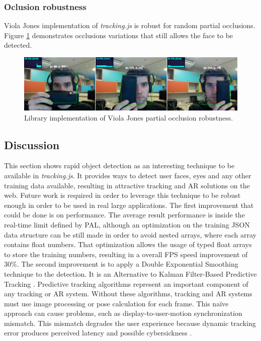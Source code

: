 
\subsubsection{Oclusion robustness} %
\label{subsub:evaluation:rapid_object_detection:results:occlusion_robustness}

Viola Jones implementation of \textit{tracking.js} is robust for random partial occlusions. Figure \ref{figure:viola_occlusion} demonstrates occlusions variations that still allows the face to be detected.

\begin{figure}[!htb]
  \centering
  \includegraphics[width=\linewidth]{chapters/evaluation/viola_occlusion.png}
  \caption{Library implementation of Viola Jones partial occlusion robustness.}
  \label{figure:viola_occlusion}
\end{figure}


\subsection{Discussion} %
\label{sub:evaluation:rapid_object_detection:discussion}

This section shows rapid object detection as an interesting technique to be available in \textit{tracking.js}. It provides ways to detect user faces, eyes and any other training data available, resulting in attractive tracking and AR solutions on the web. Future work is required in order to leverage this technique to be robust enough in order to be used in real large applications. The first improvement that could be done is on performance. The average result performance is inside the real-time limit defined by PAL, although an optimization on the training JSON data structure can be still made in order to avoid nested arrays, where each array contains float numbers. That optimization allows the usage of typed float arrays to store the training numbers, resulting in a overall FPS speed improvement of $30\%$. The second improvement is to apply a Double Exponential Smoothing technique to the detection. It is an Alternative to Kalman Filter-Based Predictive Tracking \cite{LaViola2003}. Predictive tracking algorithms represent an important component of any tracking or AR system. Without these algorithms, tracking and AR systems must use image processing or pose calculation for each frame. This naïve approach can cause problems, such as display-to-user-motion synchronization mismatch. This mismatch degrades the user experience because dynamic tracking error produces perceived latency and possible cybersickness \cite{LaViolaJr.2000}.

